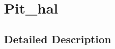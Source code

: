 \hypertarget{group__pit__hal}{}\section{Pit\+\_\+hal}
\label{group__pit__hal}


\subsection{Detailed Description}
